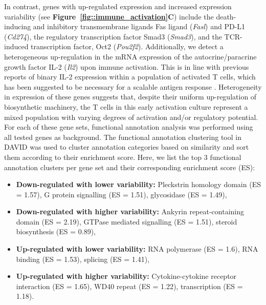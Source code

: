 In contrast, genes with up-regulated expression and increased expression variability (see \textbf{Figure~\ref{fig::immune_activation}C}) include the death-inducing and inhibitory transmembrane ligands Fas ligand (\textit{Fasl}) and PD-L1 (\textit{Cd274}), the regulatory transcription factor Smad3 (\textit{Smad3}), and the TCR-induced transcription factor, Oct2 (\textit{Pou2f2}). Additionally, we detect a heterogeneous up-regulation in the mRNA expression of the autocrine/paracrine growth factor IL-2 (\textit{Il2}) upon immune activation. This is in line with previous reports of binary IL-2 expression within a population of activated T cells, which has been suggested to be necessary for a scalable antigen response \citep{Fuhrmann2016}. Heterogeneity in expression of these genes suggests that, despite their uniform up-regulation of biosynthetic machinery, the T cells in this early activation culture represent a mixed population with varying degrees of activation and/or regulatory potential. \\

For each of these gene sets, functional annotation analysis was performed using all tested genes as background. The functional annotation clustering tool in DAVID \citep{Dennis2003} was used to cluster annotation categories based on similarity and sort them according to their enrichment score. Here, we  list the top 3 functional annotation clusters per gene set and their corresponding enrichment score (ES):
\begin{itemize}
\item \textbf{Down-regulated with lower variability:} Pleckstrin homology domain (ES = 1.57), G protein signalling (ES = 1.51), glycosidase (ES = 1.49),
\item \textbf{Down-regulated with higher variability:} Ankyrin repeat-containing domain (ES = 2.19), GTPase mediated signalling (ES = 1.51), steroid biosynthesis (ES = 0.89), 
\item \textbf{Up-regulated with lower variability:} RNA polymerase (ES = 1.6), RNA binding (ES = 1.53), splicing (ES = 1.41),
\item \textbf{Up-regulated with higher variability:} Cytokine-cytokine receptor interaction (ES = 1.65), WD40 repeat (ES = 1.22), transcription (ES = 1.18).
\end{itemize}

